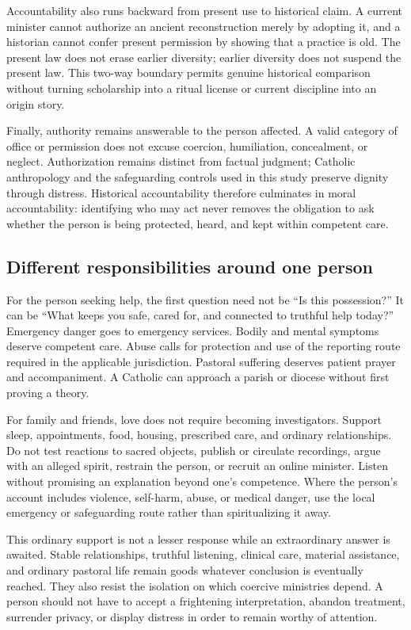 Accountability also runs backward from present use to historical claim. A
current minister cannot authorize an ancient reconstruction merely by adopting
it, and a historian cannot confer present permission by showing that a practice
is old. The present law does not erase earlier diversity; earlier diversity
does not suspend the present law. This two-way boundary permits genuine
historical comparison without turning scholarship into a ritual license or
current discipline into an origin story.

Finally, authority remains answerable to the person affected. A valid category
of office or permission does not excuse coercion, humiliation, concealment, or
neglect. Authorization remains distinct from factual judgment; Catholic
anthropology and the safeguarding controls used in this study preserve dignity
through distress. Historical
accountability therefore culminates in moral accountability: identifying who
may act never removes the obligation to ask whether the person is being
protected, heard, and kept within competent care.

\subsection{Different responsibilities around one person}

For the person seeking help, the first question need not be ``Is this
possession?'' It can be ``What keeps you safe, cared for, and connected to
truthful help today?'' Emergency danger goes to emergency services. Bodily and
mental symptoms deserve competent care. Abuse calls for protection and use of
the reporting route required in the applicable jurisdiction. Pastoral suffering
deserves patient prayer and accompaniment. A
Catholic can approach a parish or diocese without first proving a theory.

For family and friends, love does not require becoming investigators. Support
sleep, appointments, food, housing, prescribed care, and ordinary relationships.
Do not test reactions to sacred objects, publish or circulate recordings, argue
with an alleged
spirit, restrain the person, or recruit an online minister. Listen without
promising an explanation beyond one's competence. Where the person's account
includes violence, self-harm, abuse, or medical danger, use the local emergency
or safeguarding route rather than spiritualizing it away.

This ordinary support is not a lesser response while an extraordinary answer
is awaited. Stable relationships, truthful listening, clinical care, material
assistance, and ordinary pastoral life remain goods whatever conclusion is
eventually reached. They also resist the isolation on which coercive ministries
depend. A person should not have to accept a frightening interpretation,
abandon treatment, surrender privacy, or display distress in order to remain
worthy of attention.

